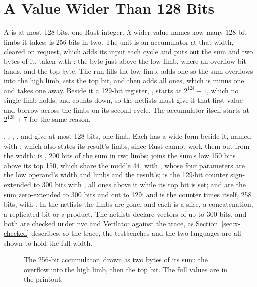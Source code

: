 \section{A Value Wider Than 128 Bits}
\label{sec:x-wide}

A  is at most 128 bits, one Rust integer. A wider value
names how many 128-bit limbs it takes:  is 256 bits
in two. The unit is an accumulator at that width, cleared on request,
which adds its input each cycle and puts out the sum and two bytes
of it, taken with : the byte just above the low limb,
where an overflow bit lands, and the top byte. The run fills the low limb, adds
one so the sum overflows into the high limb, sets the top bit, and then
adds all ones, which is minus one and takes one away. Beside it a
129-bit register, , starts at $2^{128}+1$, which no single
limb holds, and counts down, so the netlists must give it that first
value and borrow across the limbs on its second cycle. The accumulator
itself starts at $2^{128}+7$ for the same reason.

, , , , 
and  give at most 128 bits, one limb. Each has a wide form
beside it, named with , which also states its result's
limbs, since Rust cannot work them out from the width: 
is , 200 bits of the sum in two limbs;
 joins the sum's low 150 bits above its top 150, which
share the middle 44, with , whose
four parameters are the low operand's width and limbs and the result's;
 is the 129-bit counter sign-extended to 300 bits with
, all ones above it while its top bit is set;
 and  are the sum zero-extended to 300 bits and
cut to 129; and  is the counter times itself, 258 bits,
with . In the netlists the limbs are gone, and each is
a slice, a concatenation, a replicated bit or a product.
The netlists declare vectors of up to 300 bits, and both are checked
under nvc and Verilator
against the trace, as Section~\ref{sec:x-checked} describes, so the
trace, the testbenches and the two languages are all shown to hold
the full width.

\begin{figure}[htbp]
\centering

\caption{The 256-bit accumulator, drawn as two bytes of its sum: the
overflow into the high limb, then the top bit. The full values are in
the printout.}
\label{fig:x-wide}
\end{figure}




